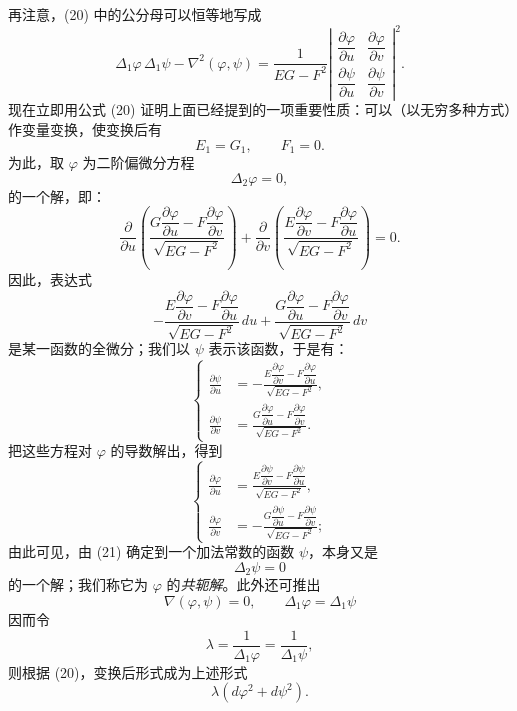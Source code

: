 再注意，(20) 中的公分母可以恒等地写成
\[
\Delta_1\varphi\,\Delta_1\psi-\nabla^2(\varphi,\psi)=
\frac{1}{EG-F^2}
\left|
\begin{matrix}
\dfrac{\partial\varphi}{\partial u}&\dfrac{\partial\varphi}{\partial v}\\[0.4em]
\dfrac{\partial\psi}{\partial u}&\dfrac{\partial\psi}{\partial v}
\end{matrix}
\right|^2.
\]
现在立即用公式 (20) 证明上面已经提到的一项重要性质：可以（以无穷多种方式）作变量变换，使变换后有
\[
 E_1=G_1,
 \qquad
 F_1=0.
\]
为此，取 \(\varphi\) 为二阶偏微分方程
\[
 \Delta_2\varphi=0,
\]
的一个解，即：
\[
\frac{\partial}{\partial u}\left(\frac{G\dfrac{\partial\varphi}{\partial u}-F\dfrac{\partial\varphi}{\partial v}}{\sqrt{EG-F^2}}\right)+
\frac{\partial}{\partial v}\left(\frac{E\dfrac{\partial\varphi}{\partial v}-F\dfrac{\partial\varphi}{\partial u}}{\sqrt{EG-F^2}}\right)=0.
\]
因此，表达式
\[
-\frac{E\dfrac{\partial\varphi}{\partial v}-F\dfrac{\partial\varphi}{\partial u}}{\sqrt{EG-F^2}}\,du+
\frac{G\dfrac{\partial\varphi}{\partial u}-F\dfrac{\partial\varphi}{\partial v}}{\sqrt{EG-F^2}}\,dv
\]
是某一函数的全微分；我们以 \(\psi\) 表示该函数，于是有：
\begin{equation}\tag{21}
\left\{
\begin{aligned}
\frac{\partial\psi}{\partial u}&=-\frac{E\dfrac{\partial\varphi}{\partial v}-F\dfrac{\partial\varphi}{\partial u}}{\sqrt{EG-F^2}},\\[0.7em]
\frac{\partial\psi}{\partial v}&=\frac{G\dfrac{\partial\varphi}{\partial u}-F\dfrac{\partial\varphi}{\partial v}}{\sqrt{EG-F^2}}.
\end{aligned}
\right.
\end{equation}
把这些方程对 \(\varphi\) 的导数解出，得到
\begin{equation}\tag{21*}
\left\{
\begin{aligned}
\frac{\partial\varphi}{\partial u}&=\frac{E\dfrac{\partial\psi}{\partial v}-F\dfrac{\partial\psi}{\partial u}}{\sqrt{EG-F^2}},\\[0.7em]
\frac{\partial\varphi}{\partial v}&=-\frac{G\dfrac{\partial\psi}{\partial u}-F\dfrac{\partial\psi}{\partial v}}{\sqrt{EG-F^2}};
\end{aligned}
\right.
\end{equation}
由此可见，由 (21) 确定到一个加法常数的函数 \(\psi\)，本身又是
\[
 \Delta_2\psi=0
\]
的一个解；我们称它为 \(\varphi\) 的\emph{共轭解}。此外还可推出
\[
 \nabla(\varphi,\psi)=0,
 \qquad
 \Delta_1\varphi=\Delta_1\psi
\]
因而令
\[
 \lambda=\frac{1}{\Delta_1\varphi}=\frac{1}{\Delta_1\psi},
\]
则根据 (20)，变换后形式成为上述形式
\[
 \lambda(d\varphi^2+d\psi^2).
\]

